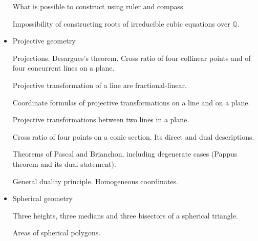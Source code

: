 \begin{itemize}
What is possible to construct using ruler and compass.

{\color{light-gray}Impossibility of constructing roots of irreducible cubic equations over $\mathbb{Q}$.}

\item Projective geometry

Projections. Desargues's theorem. Cross ratio of four collinear points and of four concurrent lines on a plane.

Projective transformation of a line are fractional-linear.

Coordinate formulas of projective transformations on a line and on a plane.

Projective transformations between two lines in a plane.

Cross ratio of four points on a conic section. Its direct and dual descriptions.

Theorems of Pascal and Brianchon, including degenerate cases (Pappus theorem
and its dual statement).

General duality principle. Homogeneous coordinates.

\item Spherical geometry

Three heights, three medians and three bisectors of a spherical triangle.

Areas of spherical polygons.

\end{itemize}
